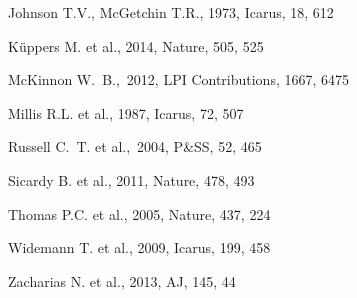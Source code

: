 \documentclass[useAMS,usenatbib]{mn2e}
\begin{document}
\begin{thebibliography}{99}
 Johnson T.V., McGetchin T.R., 1973,
Icarus, 18, 612

 K\"{u}ppers M. et al., 2014,
Nature, 505, 525

 McKinnon W.~B.,\ 2012, LPI 
Contributions, 1667, 6475 

 Millis R.L. et al., 1987,
Icarus, 72, 507


 Russell C.~T. et al.,\ 2004, P\&SS, 52, 465 


 Sicardy B. et al., 2011,
Nature, 478, 493

 Thomas P.C. et al., 2005,
Nature, 437, 224


 Widemann T. et al., 2009,
Icarus, 199, 458


 Zacharias N. et al., 2013,
AJ, 145, 44



\end{thebibliography}




\label{lastpage}
\end{document}
